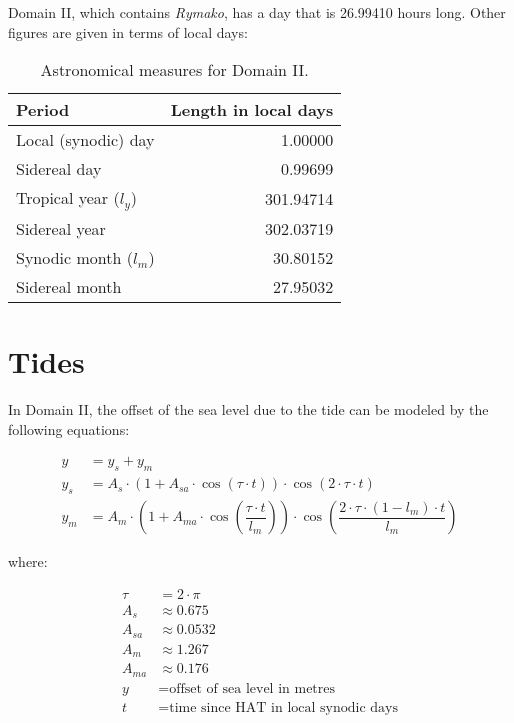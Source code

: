 \documentclass{book}
\begin{document}
Domain II, which contains \emph{Rymako}, has a day that is 26.99410 hours long. Other figures are given in terms of local days:

\begin{table}[ht]
    \caption{Astronomical measures for Domain II.}
    \centering
    \begin{tabular}{|l|r|}
        \hline
        Period & Length in local days \\
        \hline
        Local (synodic) day & 1.00000 \\
        Sidereal day & 0.99699 \\
        Tropical year ($l_y$) & 301.94714 \\
        Sidereal year & 302.03719 \\
        Synodic month ($l_m$) & 30.80152 \\
        Sidereal month & 27.95032 \\
        \hline
    \end{tabular}
\end{table}

\section{Tides}

In Domain II, the offset of the sea level due to the tide can be modeled by the following equations:

\begin{align}
    y &= y_s + y_m \\
    y_s &= A_s \cdot \left(1 + A_{sa} \cdot \cos(\tau \cdot t)\right) \cdot \cos(2 \cdot \tau \cdot t) \\
    y_m &= A_m \cdot \left(1 + A_{ma} \cdot \cos\left(\dfrac{\tau \cdot t}{l_m}\right)\right) \cdot \cos\left(\dfrac{2 \cdot \tau \cdot (1 - l_m) \cdot t}{l_m}\right)
\end{align}

where:

\begin{align*}
    \tau &= 2 \cdot \pi \\
    A_s &\approx 0.675 \\
    A_{sa} &\approx 0.0532 \\
    A_m &\approx 1.267 \\
    A_{ma} &\approx 0.176 \\
    y &= \text{offset of sea level in metres} \\
    t &= \text{time since HAT in local synodic days}
\end{align*}
\end{document}
